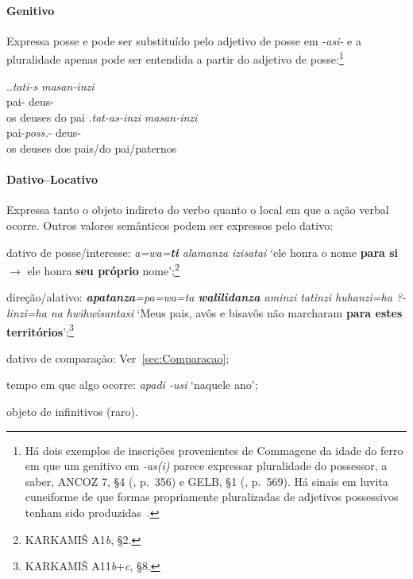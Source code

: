 \paragraph{Genitivo}
Expressa posse e pode ser substituído pelo adjetivo de posse em \emph{-asi-} e a
pluralidade apenas pode ser entendida a partir do adjetivo de posse:\footnote{
Há dois exemplos de inscrições provenientes de Commagene da idade do ferro em
que um genitivo em \emph{-as{(i)}} parece expressar pluralidade do possessor,
a saber, ANCOZ 7, §4 (, p.\ 356) e GELB, §1
(, p.\ 569). Há sinais em luvita cuneiforme de que formas
propriamente pluralizadas de adjetivos possessivos tenham sido
produzidas~\citep[pp. 45ff.]{Yakubovich2010}.
}

\ex.\ag.\emph{tati-s} \emph{masan-inzi}\\
pai-\Gen\Sg\Com{} deus-\Nom\Pl\Com{}\\
os deuses do pai
\bg.\emph{tat-as-inzi} \emph{masan-inzi}\\
pai-\emph{poss.}-\Nom\Pl\Com{} deus-\Nom\Pl\Com{}\\
os deuses dos pais\slash{}do pai\slash{}paternos


\paragraph{Dativo--Locativo}
Expressa tanto o objeto indireto do verbo quanto o local em que a ação verbal
ocorre. Outros valores semânticos podem ser expressos pelo dativo:
\begin{inparaenum}[(a)]
	\item dativo de posse\slash{}interesse:
	\emph{a=wa=\textbf{ti} alamanza izisatai}
	`ele
	honra o nome \textbf{para si} $\rightarrow$ ele honra \textbf{seu próprio}
	nome';\footnote{KARKAMIŠ A1\emph{b}, §2.}
	\item  direção\slash{}alativo:
	\emph{\textbf{apatanza}=pa=wa=ta \textbf{walilidanza} aminzi tatinzi
	huhanzi=ha {?}-linzi=ha na hwi\-hwisantasi}
	`Meus pais, avôs e bisavôs não marcharam \textbf{para estes
		territórios}';\footnote{KARKAMIŠ A11\emph{b}+\emph{c}, §8.}
	\item dativo de comparação: Ver~\autoref{sec:Comparacao};
	\item tempo em que algo ocorre: \emph{apa\-di -usi} `naquele ano';
	\item objeto de infinitivos (raro).
\end{inparaenum}


